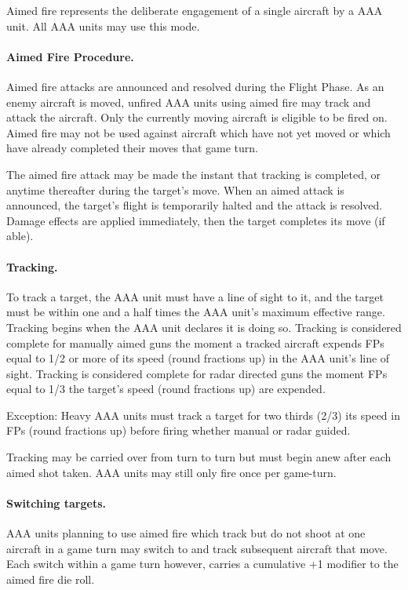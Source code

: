 Aimed fire represents the deliberate engagement of a single aircraft by a AAA unit. All AAA units may use this mode.

\paragraph{Aimed Fire Procedure.} Aimed fire attacks are announced and resolved during the Flight Phase. As an enemy aircraft is moved, unfired AAA units using aimed fire may track and attack the aircraft. Only the currently moving aircraft is eligible to be fired on. Aimed fire may not be used against aircraft which have not yet moved or which have already completed their moves that game turn.

The aimed fire attack may be made the instant that tracking is completed, or anytime thereafter during the target's move. When an aimed attack is announced, the target's flight is temporarily halted and the attack is resolved. Damage effects are applied immediately, then the target completes its move (if able).

\paragraph{Tracking.} To track a target, the AAA unit must have a line of sight to it, and the target must be within one and a half times the AAA unit's maximum effective range. Tracking begins when the AAA unit declares it is doing so. Tracking is considered complete for manually aimed guns the moment a tracked aircraft expends FPs equal to 1/2 or more of its speed (round fractions up) in the AAA unit's line of sight. Tracking is considered complete for radar directed guns the moment FPs equal to 1/3 the target's speed (round fractions up) are expended.

Exception: Heavy AAA units must track a target for two thirds (2/3) its speed in FPs (round fractions up) before firing whether manual or radar guided.

Tracking may be carried over from turn to turn but must begin anew after each aimed shot taken. AAA units may still only fire once per game-turn.

\paragraph{Switching targets.} AAA units planning to use aimed fire which track but do not shoot at one aircraft in a game turn may switch to and track subsequent aircraft that move. Each switch within a game turn however, carries a cumulative +1 modifier to the aimed fire die roll.

